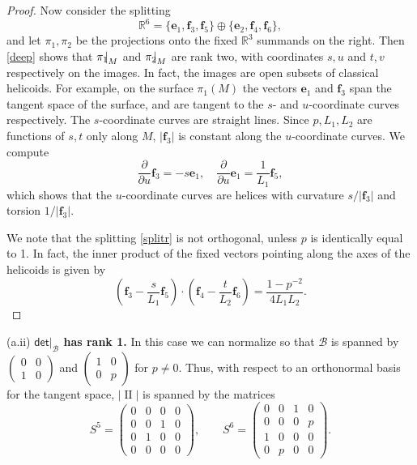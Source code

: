 \documentclass[12pt,reqno]{amsart}
\theoremstyle{definition}
\theoremstyle{remark}
\begin{document}
\begin{proof}
Now consider the splitting
\begin{equation}\label{splitr}
{\mathbb R}^6 = \{{\mathbf e}_1, {\mathbf f}_3, {\mathbf f}_5  \} \oplus \{{\mathbf e}_2, {\mathbf f}_4, {\mathbf f}_6\},
\end{equation}
and let $\pi_1, \pi_2$ be the projections onto the fixed ${\mathbb R}^3$ summands on the right.
Then \eqref{deep} shows that $\pi_1{\negthickspace \mid}_M$ and $\pi_2{\negthickspace \mid}_M$ are rank two,
with coordinates $s,u$ and $t,v$ respectively on the images.
In fact, the images are open subsets of classical helicoids.  For example, on the surface $\pi_1(M)$
the vectors ${\mathbf e}_1$ and ${\mathbf f}_3$ span the tangent space of the surface,
and are tangent to the $s$- and $u$-coordinate curves respectively.
The $s$-coordinate curves are straight lines.
Since $p, L_1, L_2$ are functions of $s,t$ only along $M$,
$|{\mathbf f}_3|$ is constant along the $u$-coordinate curves.  We compute
$$\dfrac{\partial}{{\partial} u} {\mathbf f}_3 = -s{\mathbf e}_1, \quad \dfrac{\partial}{{\partial} u} {\mathbf e}_1 = \dfrac{1}{L_1}{\mathbf f}_5,$$
which shows that the $u$-coordinate curves are helices with
curvature $s/|{\mathbf f}_3|$ and torsion $1/|{\mathbf f}_3|$.

We note that the splitting \eqref{splitr} is not orthogonal, unless $p$ is identically equal to 1.
In fact, the inner product of the fixed vectors pointing along
the axes of the helicoids is given by
$$\left({\mathbf f}_3 - \dfrac{s}{L_1} {\mathbf f}_5\right) \cdot \left({\mathbf f}_4 - \dfrac{t}{L_2}{\mathbf f}_6\right)
=\dfrac{1-p^{-2}}{4L_1 L_2}.$$
\end{proof}

(a.ii) {\bf ${\mathsf{det}}|_{\mathcal B}$ has rank 1.} In this case we can normalize so that ${\mathcal B}$ is spanned by
$\left(\begin{smallmatrix} 0 & 0 \\ 1 & 0 \end{smallmatrix}\right)$
and $\left(\begin{smallmatrix} 1 & 0 \\ 0 & p \end{smallmatrix}\right)$ for $p\ne 0$.
Thus, with respect to an orthonormal basis for the tangent space, $| {\operatorname{II}} |$ is spanned by the matrices
$$S^5 = \begin{pmatrix} 0 & 0 & 0 & 0\\ 0 & 0 & 1 & 0\\ 0 & 1 & 0 & 0 \\ 0 & 0 & 0 & 0 \end{pmatrix},\qquad
S^6 = \begin{pmatrix} 0 & 0& 1 & 0 \\ 0 & 0 & 0 & p \\ 1 & 0 & 0 & 0 \\ 0 & p & 0 & 0 \end{pmatrix}.$$
\end{document}
